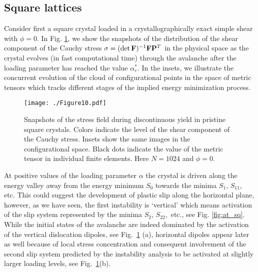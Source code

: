 \documentclass[CRPHYS,Unicode,manuscript]{cedram}
\begin{document}
\subsection{Square lattices}

Consider first a square crystal loaded in a  crystallographically exact  simple shear with $\phi=0$.  In Fig. \ref{fig:sq0}, we show the snapshots of the distribution of the shear component of the Cauchy stress  ${\bf \sigma} = (\det{\bf F})^{-1}{\bf F}{\bf P}^T$ in the physical space as the crystal evolves (in fast computational time) through the   avalanche after the loading parameter  has reached  the   value $\alpha_c^* $. In the insets,  we illustrate  the concurrent evolution  of the cloud of configurational points in the space of metric tensors which tracks different stages of  the implied energy minimization process.

\begin{figure}[h!]
\centering
\texttt{[image: ./Figure10.pdf]}
\caption{\scriptsize {Snapshots of the stress field during discontinuous yield in pristine square crystals. Colors indicate the level of the shear component of the Cauchy stress. Insets show the same images in the configurational space. Black dots indicate the value of the metric tensor in individual finite elements.
 Here $N=1024$ and $\phi=0$. }
 \label{fig:sq0}}
\end{figure} 

At  positive values of the loading parameter $\alpha$   the crystal  is driven along the energy valley  away  from the energy minimum $S_0$   towards   the minima  $S_1$, $S_{11}, $ etc.  This  could suggest the development of plastic slip along the horizontal  plane, however, as we have seen,  the first instability is `vertical'   which means activation of the slip system  represented by the minima  $S_2$, $S_{22},$ etc., see Fig. \ref{fig:at_sq}. While the initial states of the avalanche  are indeed dominated by the activation of the vertical dislocation dipoles, see Fig.~\ref{fig:sq0} (a), horizontal dipoles  appear later as well  because of local stress concentration and consequent involvement of the second slip system  predicted by the instability analysis to be activated at slightly larger loading levels, see Fig.~\ref{fig:sq0}(b). 
\end{document}
